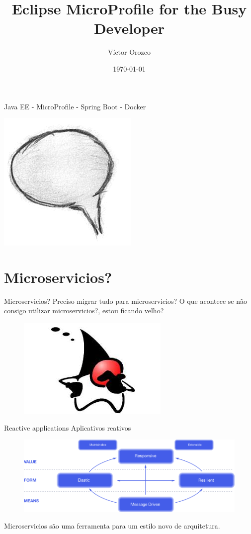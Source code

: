 \documentclass{beamer}
\title{Eclipse MicroProfile for the Busy Developer}
\author{Víctor Orozco}
\institute{@tuxtor}
\date{\today}
\begin{document}
\frame{\titlepage}

\begin{frame}{Java EE - MicroProfile - Spring Boot - Docker}
\begin{center}
	\includegraphics[width=0.4\linewidth]{Images/comment}
\end{center}
\end{frame}

\section{Microservicios?}
\begin{frame}{Microservicios?}
\Large Preciso migrar tudo para microservicios? O que acontece se não consigo utilizar microservicios?, estou ficando velho?
\begin{figure}
	\centering
	\includegraphics[width=0.6\linewidth]{Images/dukewhy}
\end{figure}
\end{frame}

\begin{frame}{Reactive applications}
Aplicativos reativos
\begin{figure}
	\centering
	\includegraphics[width=\linewidth]{Images/reactive-traits}
\end{figure}
Microservicios são uma ferramenta para um estilo novo de arquitetura.
\end{frame}
\end{document}
